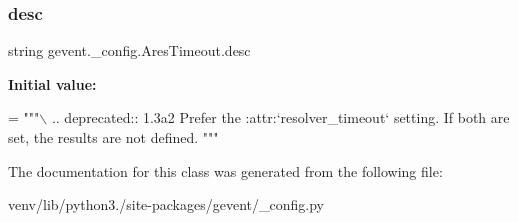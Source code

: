 \subsubsection{\texorpdfstring{desc}{desc}}
{\footnotesize\ttfamily string gevent.\+\_\+config.\+Ares\+Timeout.\+desc\hspace{0.3cm}{\ttfamily [static]}}

{\bfseries Initial value\+:}
\begin{DoxyCode}
=  \textcolor{stringliteral}{"""\(\backslash\)}
\textcolor{stringliteral}{}
\textcolor{stringliteral}{.. deprecated:: 1.3a2}
\textcolor{stringliteral}{   Prefer the :attr:`resolver\_timeout` setting. If both are set,}
\textcolor{stringliteral}{   the results are not defined.}
\textcolor{stringliteral}{"""}
\end{DoxyCode}


The documentation for this class was generated from the following file\+:\begin{DoxyCompactItemize}
\item 
venv/lib/python3./site-\/packages/gevent/\+\_\+config.\+py\end{DoxyCompactItemize}
